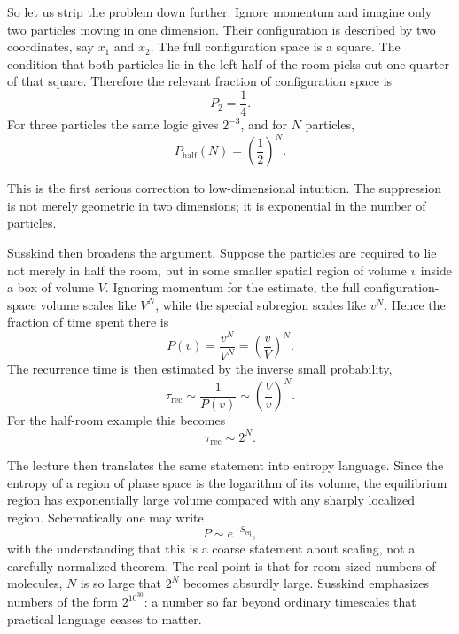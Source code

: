So let us strip the problem down further. Ignore momentum and imagine only two particles moving in one dimension. Their configuration is described by two coordinates, say \(x_1\) and \(x_2\). The full configuration space is a square. The condition that both particles lie in the left half of the room picks out one quarter of that square. Therefore the relevant fraction of configuration space is
\begin{equation}
P_2=\frac{1}{4}.
\end{equation}
For three particles the same logic gives \(2^{-3}\), and for \(N\) particles,
\begin{equation}
P_{\mathrm{half}}(N)=\left(\frac{1}{2}\right)^N.
\end{equation}

This is the first serious correction to low-dimensional intuition. The suppression is not merely geometric in two dimensions; it is exponential in the number of particles.

Susskind then broadens the argument. Suppose the particles are required to lie not merely in half the room, but in some smaller spatial region of volume \(v\) inside a box of volume \(V\). Ignoring momentum for the estimate, the full configuration-space volume scales like \(V^N\), while the special subregion scales like \(v^N\). Hence the fraction of time spent there is
\begin{equation}
P(v)=\frac{v^N}{V^N}=\left(\frac{v}{V}\right)^N.
\end{equation}
The recurrence time is then estimated by the inverse small probability,
\begin{equation}
\tau_{\mathrm{rec}} \sim \frac{1}{P(v)} \sim \left(\frac{V}{v}\right)^N.
\end{equation}
For the half-room example this becomes
\begin{equation}
\tau_{\mathrm{rec}} \sim 2^N.
\end{equation}

The lecture then translates the same statement into entropy language. Since the entropy of a region of phase space is the logarithm of its volume, the equilibrium region has exponentially large volume compared with any sharply localized region. Schematically one may write
\begin{equation}
P \sim e^{-S_{\mathrm{eq}}},
\end{equation}
with the understanding that this is a coarse statement about scaling, not a carefully normalized theorem. The real point is that for room-sized numbers of molecules, \(N\) is so large that \(2^N\) becomes absurdly large. Susskind emphasizes numbers of the form \(2^{10^{30}}\): a number so far beyond ordinary timescales that practical language ceases to matter.

